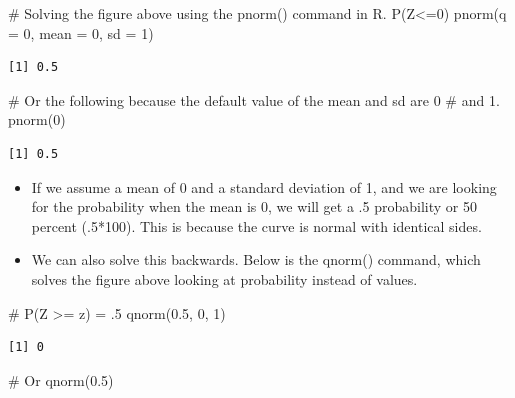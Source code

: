 \documentclass[
  letterpaper,
  DIV=11,
  numbers=noendperiod]{scrreprt}
\newenvironment{Shaded}{\begin{snugshade}}{\end{snugshade}}
\newcommand{\AttributeTok}[1]{\textcolor[rgb]{0.40,0.45,0.13}{#1}}
\newcommand{\CommentTok}[1]{\textcolor[rgb]{0.37,0.37,0.37}{#1}}
\newcommand{\DecValTok}[1]{\textcolor[rgb]{0.68,0.00,0.00}{#1}}
\newcommand{\FloatTok}[1]{\textcolor[rgb]{0.68,0.00,0.00}{#1}}
\newcommand{\FunctionTok}[1]{\textcolor[rgb]{0.28,0.35,0.67}{#1}}
\newcommand{\NormalTok}[1]{\textcolor[rgb]{0.00,0.23,0.31}{#1}}
\begin{document}
\begin{Shaded}
\begin{Highlighting}[]
\CommentTok{\# Solving the figure above using the pnorm() command in R.  P(Z\textless{}=0)}
\FunctionTok{pnorm}\NormalTok{(}\AttributeTok{q =} \DecValTok{0}\NormalTok{, }\AttributeTok{mean =} \DecValTok{0}\NormalTok{, }\AttributeTok{sd =} \DecValTok{1}\NormalTok{)}
\end{Highlighting}
\end{Shaded}

\begin{verbatim}
[1] 0.5
\end{verbatim}

\begin{Shaded}
\begin{Highlighting}[]
\CommentTok{\# Or the following because the default value of the mean and sd are 0}
\CommentTok{\# and 1.}
\FunctionTok{pnorm}\NormalTok{(}\DecValTok{0}\NormalTok{)}
\end{Highlighting}
\end{Shaded}

\begin{verbatim}
[1] 0.5
\end{verbatim}

\begin{itemize}
\item
  If we assume a mean of 0 and a standard deviation of 1, and we are
  looking for the probability when the mean is 0, we will get a .5
  probability or 50 percent (.5*100). This is because the curve is
  normal with identical sides.
\item
  We can also solve this backwards. Below is the qnorm() command, which
  solves the figure above looking at probability instead of values.
\end{itemize}

\begin{Shaded}
\begin{Highlighting}[]
\CommentTok{\# P(Z \textgreater{}= z) = .5}
\FunctionTok{qnorm}\NormalTok{(}\FloatTok{0.5}\NormalTok{, }\DecValTok{0}\NormalTok{, }\DecValTok{1}\NormalTok{)}
\end{Highlighting}
\end{Shaded}

\begin{verbatim}
[1] 0
\end{verbatim}

\begin{Shaded}
\begin{Highlighting}[]
\CommentTok{\# Or}
\FunctionTok{qnorm}\NormalTok{(}\FloatTok{0.5}\NormalTok{)}
\end{Highlighting}
\end{Shaded}
\end{document}
